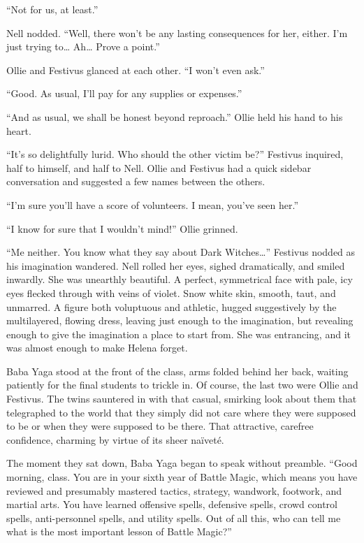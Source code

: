 “Not for us, at least.”

Nell nodded. “Well, there won’t be any lasting consequences for her, either. I’m just trying to… Ah… Prove a point.”

Ollie and Festivus glanced at each other. “I won’t even ask.”

“Good. As usual, I’ll pay for any supplies or expenses.”

“And as usual, we shall be honest beyond reproach.” Ollie held his hand to his heart.

“It’s so delightfully lurid. Who should the other victim be?” Festivus inquired, half to himself, and half to Nell. Ollie and Festivus had a quick sidebar conversation and suggested a few names between the others.

“I’m sure you’ll have a score of volunteers. I mean, you’ve seen her.”

“I know for sure that I wouldn’t mind!” Ollie grinned.

“Me neither. You know what they say about Dark Witches…” Festivus nodded as his imagination wandered. Nell rolled her eyes, sighed dramatically, and smiled inwardly.
\simpleline
{}
She was unearthly beautiful. A perfect, symmetrical face with pale, icy eyes flecked through with veins of violet. Snow white skin, smooth, taut, and unmarred. A figure both voluptuous and athletic, hugged suggestively by the multilayered, flowing dress, leaving just enough to the imagination, but revealing enough to give the imagination a place to start from. She was entrancing, and it was almost enough to make Helena forget.

Baba Yaga stood at the front of the class, arms folded behind her back, waiting patiently for the final students to trickle in. Of course, the last two were Ollie and Festivus. The twins sauntered in with that casual, smirking look about them that telegraphed to the world that they simply did not care where they were supposed to be or when they were supposed to be there. That attractive, carefree confidence, charming by virtue of its sheer naïveté.

The moment they sat down, Baba Yaga began to speak without preamble. “Good morning, class. You are in your sixth year of Battle Magic, which means you have reviewed and presumably mastered tactics, strategy, wandwork, footwork, and martial arts. You have learned offensive spells, defensive spells, crowd control spells, anti-personnel spells, and utility spells. Out of all this, who can tell me what is the most important lesson of Battle Magic?”

